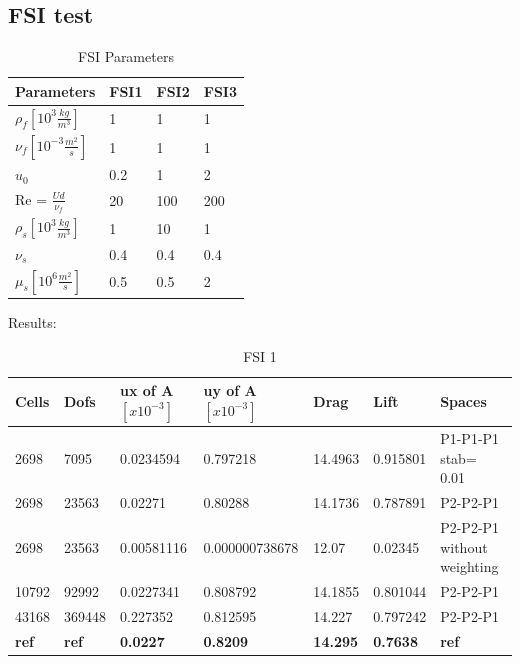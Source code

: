 \subsection*{FSI test}
\begin{table}[ht]
\centering
\caption{FSI Parameters}
\label{my-label}
\begin{tabular}{|l|l|l|l|}
\hline
Parameters & FSI1 & FSI2 & FSI3 \\ \hline
$\rho_f[10^3 \frac{kg}{m^3}]$ & 1 & 1 & 1 \\ \hline
$\nu_f [10^{-3} \frac{m^2}{s}]$ & 1 & 1 & 1 \\ \hline
$u_0$ & 0.2 & 1 & 2 \\ \hline
Re = $\frac{U d}{\nu_f}$ & 20 & 100 & 200 \\ \hline
$\rho_s[10^3 \frac{kg}{m^3}]$ & 1 & 10 & 1 \\ \hline
$\nu_s$ & 0.4 & 0.4 & 0.4 \\ \hline
$\mu_s[10^6 \frac{m^2}{s}]$ & 0.5 & 0.5 & 2 \\ \hline
\end{tabular}
\end{table}
Results: 
\begin{table}[h]
\centering
\caption{FSI 1}
\label{my-label}
\begin{tabular}{|l|l|l|l|l|l|l|}
\hline
Cells & Dofs & ux of A $[x10^{-3}]$ & uy of A $[x10^{-3}]$ & Drag & Lift & Spaces \\ \hline
2698 & 7095 & 0.0234594 & 0.797218  & 14.4963 & 0.915801 & P1-P1-P1 stab= 0.01 \\ \hline
2698 & 23563 & 0.02271 & 0.80288 & 14.1736 & 0.787891 & P2-P2-P1 \\ \hline
2698 & 23563 & 0.00581116 & 0.000000738678  & 12.07 & 0.02345 & P2-P2-P1 without weighting \\ \hline
10792 & 92992 & 0.0227341 & 0.808792 & 14.1855 & 0.801044 & P2-P2-P1 \\ \hline
43168 & 369448 & 0.227352 & 0.812595 & 14.227 & 0.797242 & P2-P2-P1 \\ \hline
\textbf{ref} & \textbf{ref} & \textbf{0.0227} & \textbf{0.8209} & \textbf{14.295} & \textbf{0.7638} & \textbf{ref} \\ \hline
\end{tabular}
\end{table}